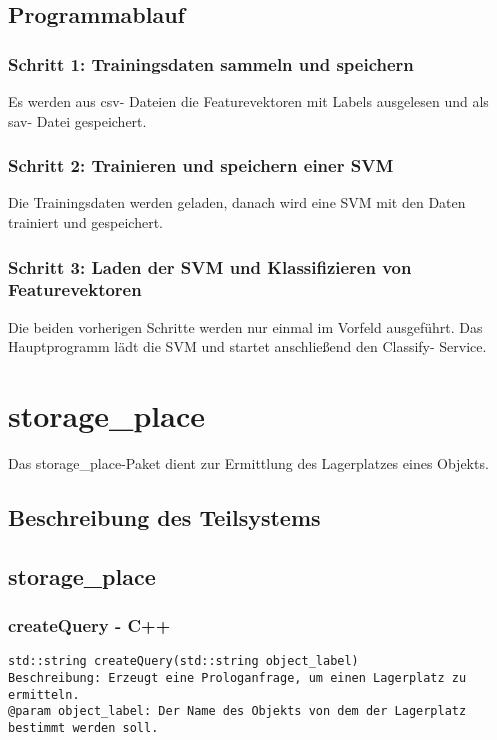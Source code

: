 \documentclass{suturo}
\begin{document}
\subsection{Programmablauf}
\subsubsection{Schritt 1: Trainingsdaten sammeln und speichern}
Es werden aus csv- Dateien die Featurevektoren mit Labels ausgelesen und als sav- Datei gespeichert.

\subsubsection{Schritt 2: Trainieren und speichern einer SVM} 
Die Trainingsdaten werden geladen, danach wird eine SVM mit den Daten trainiert und gespeichert.

\subsubsection{Schritt 3: Laden der SVM und Klassifizieren von Featurevektoren}
Die beiden vorherigen Schritte werden nur einmal im Vorfeld ausgeführt. Das Hauptprogramm lädt die SVM und startet anschließend den Classify- Service.

\section{storage\_place}
Das storage\_place-Paket dient zur Ermittlung des Lagerplatzes eines Objekts.

\begin{figure}[!htb]
\end{figure}
      
\subsection{Beschreibung des Teilsystems}

\subsection*{storage\_place}

\subsubsection{createQuery - C++}
\begin{verbatim}
std::string createQuery(std::string object_label)
Beschreibung: Erzeugt eine Prologanfrage, um einen Lagerplatz zu ermitteln.
@param object_label: Der Name des Objekts von dem der Lagerplatz bestimmt werden soll.
\end{verbatim}\label{func:segmentplanes}
\end{document}
